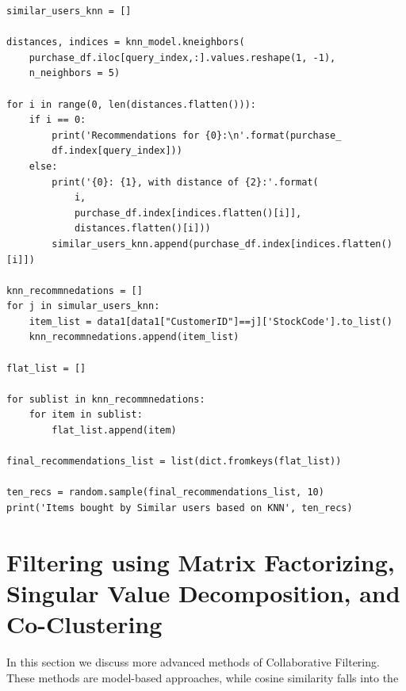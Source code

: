 \documentclass{article}
\begin{document}
\begin{lstlisting}
similar_users_knn = []

distances, indices = knn_model.kneighbors(
    purchase_df.iloc[query_index,:].values.reshape(1, -1),
    n_neighbors = 5)

for i in range(0, len(distances.flatten())):
    if i == 0:
        print('Recommendations for {0}:\n'.format(purchase_
        df.index[query_index]))
    else:
        print('{0}: {1}, with distance of {2}:'.format(
            i,
            purchase_df.index[indices.flatten()[i]],
            distances.flatten()[i]))
        similar_users_knn.append(purchase_df.index[indices.flatten()[i]])

knn_recommnedations = []
for j in simular_users_knn:
    item_list = data1[data1["CustomerID"]==j]['StockCode'].to_list()
    knn_recommnedations.append(item_list)

flat_list = []

for sublist in knn_recommnedations:
    for item in sublist:
        flat_list.append(item)

final_recommendations_list = list(dict.fromkeys(flat_list))

ten_recs = random.sample(final_recommendations_list, 10)
print('Items bought by Similar users based on KNN', ten_recs)
\end{lstlisting}

\section{Filtering using Matrix Factorizing, Singular Value Decomposition, and Co-Clustering}

In this section we discuss more advanced methods of Collaborative Filtering. These methods are model-based approaches, while cosine similarity falls into the
\end{document}
